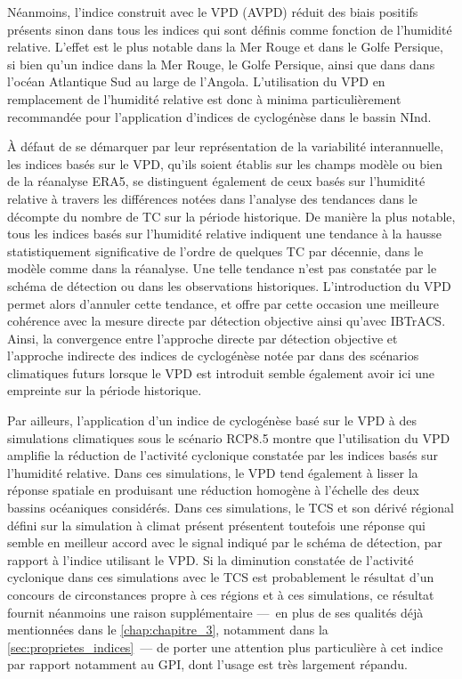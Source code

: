 \documentclass[../main.tex]{subfiles}
\begin{document}
Néanmoins, l'indice construit avec le VPD (AVPD) réduit des biais positifs présents sinon dans tous les indices qui sont définis comme fonction de l'humidité
relative. L'effet est le plus notable dans la Mer Rouge et dans le Golfe Persique, si bien qu'un indice dans la Mer Rouge, le Golfe Persique, ainsi que dans
dans l'océan Atlantique Sud au large de l'Angola. L'utilisation du VPD en remplacement de l'humidité relative est donc à minima particulièrement recommandée
pour l'application d'indices de cyclogénèse dans le bassin NInd.

À défaut de se démarquer par leur représentation de la variabilité interannuelle, les indices basés sur le VPD, qu'ils soient établis sur les champs modèle ou
bien de la réanalyse ERA5, se distinguent également de ceux basés sur l'humidité relative à travers les différences notées dans l'analyse des tendances dans le
décompte du nombre de TC sur la période historique. De manière la plus notable, tous les indices basés sur l'humidité relative indiquent une tendance à la
hausse statistiquement significative de l'ordre de quelques TC par décennie, dans le modèle comme dans la réanalyse. Une telle tendance n'est pas constatée par
le schéma de détection ou dans les observations historiques. L'introduction du VPD permet alors d'annuler cette tendance, et offre par cette occasion une
meilleure cohérence avec la mesure directe par détection objective ainsi qu'avec IBTrACS. Ainsi, la convergence entre l'approche directe par détection objective
et l'approche indirecte des indices de cyclogénèse notée par \textcite{camargo_testing_2014} dans des scénarios climatiques futurs lorsque le VPD est introduit
semble également avoir ici une empreinte sur la période historique.

Par ailleurs, l'application d'un indice de cyclogénèse basé sur le VPD à des simulations climatiques sous le scénario RCP8.5 montre que l'utilisation du VPD
amplifie la réduction de l'activité cyclonique constatée par les indices basés sur l'humidité relative. Dans ces simulations, le VPD tend également à lisser la
réponse spatiale en produisant une réduction homogène à l'échelle des deux bassins océaniques considérés. Dans ces simulations, le TCS et son dérivé régional
défini sur la simulation à climat présent présentent toutefois une réponse qui semble en meilleur accord avec le signal indiqué par le schéma de détection, par
rapport à l'indice utilisant le VPD. Si la diminution constatée de l'activité cyclonique dans ces simulations avec le TCS est probablement le résultat d'un
concours de circonstances propre à ces régions et à ces simulations, ce résultat fournit néanmoins une raison supplémentaire ---~en plus de ses qualités déjà
mentionnées dans le \cref{chap:chapitre_3}, notamment dans la \cref{sec:proprietes_indices}~--- de porter une attention plus particulière à cet indice par
rapport notamment au GPI, dont l'usage est très largement répandu.
\end{document}
